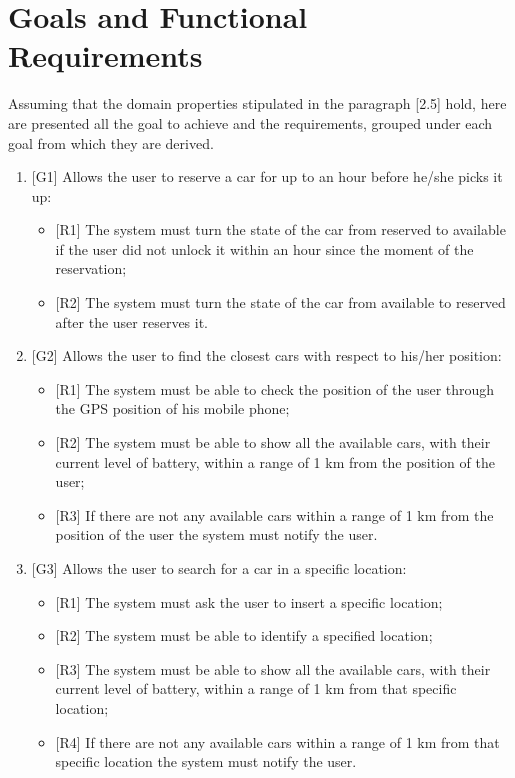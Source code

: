 \section{Goals and Functional Requirements}
Assuming that the domain properties stipulated in the paragraph [2.5] hold, here are presented all the goal to  achieve and the requirements, grouped under each goal from which they are derived.

\begin{enumerate}

\item {[G1]} Allows the user to reserve a car for up to an hour before he/she picks it up:

\begin{itemize}
	\item {[R1]} The system must turn the state of the car from reserved to available if the user did not unlock it within an hour since the moment of the reservation;
	\item {[R2]} The system must turn the state of the car from available to reserved after the user reserves it.
\end{itemize}

\item {[G2]} Allows the user to find the closest cars with respect to his/her position:

\begin{itemize}
	\item {[R1]} The system must be able to check the position of the user through the GPS position of his mobile phone;
	\item {[R2]} The system must be able to show all the available cars, with their current level of battery, within a range of 1 km from the position of the user;
	\item {[R3]} If there are not any available cars within a range of 1 km from the position of the user the system must notify the user.
\end{itemize}

\item {[G3]} Allows the user to search for a car in a specific location:

\begin{itemize}
	\item {[R1]} The system must ask the user to insert a specific location;
	\item {[R2]} The system must be able to identify a specified location;
	\item {[R3]} The system must be able to show all the available cars, with their current level of battery, within a range of 1 km from that specific location;
	\item {[R4]} If there are not any available cars within a range of 1 km from that specific location the system must notify the user.
\end{itemize}


\end{enumerate}
